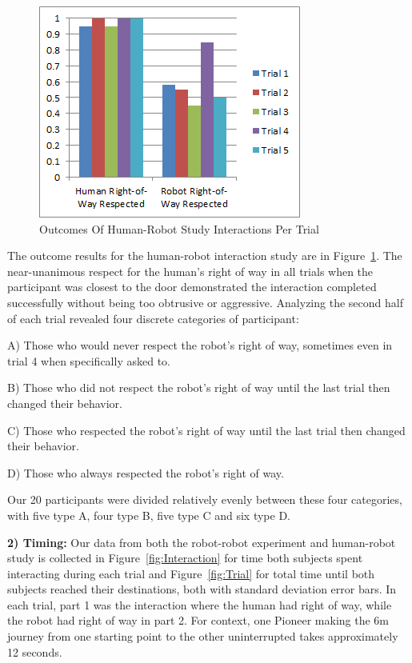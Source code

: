 \documentclass[letterpaper, 10 pt, conference]{ieeeconf}  %
\begin{document}
     \begin{figure}
      \centering
      \includegraphics{outcomes.png}
      \caption{Outcomes Of Human-Robot Study Interactions Per Trial}
      \label{fig:Outcomes}
   \end{figure}

The outcome results for the human-robot interaction study are in Figure~\ref{fig:Outcomes}. The near-unanimous respect for the human's right of way in all trials when the participant was closest to the door demonstrated the interaction completed successfully without being too obtrusive or aggressive. Analyzing the second half of each trial revealed four discrete categories of participant: 

A) Those who would never respect the robot's right of way, sometimes even in trial 4 when specifically asked to. 

B) Those who did not respect the robot's right of way until the last trial then changed their behavior. 

C) Those who respected the robot's right of way until the last trial then changed their behavior. 

D) Those who always respected the robot's right of way. 

Our 20 participants were divided relatively evenly between these four categories, with five type A, four type B, five type C and six type D.
 
\textbf{2) Timing:} Our data from both the robot-robot experiment and human-robot study is collected in Figure~\ref{fig:Interaction} for time both subjects spent interacting during each trial and Figure~\ref{fig:Trial} for total time until both subjects reached their destinations, both with standard deviation error bars. In each trial, part 1 was the interaction where the human had right of way, while the robot had right of way in part 2. For context, one Pioneer making the 6m journey from one starting point to the other uninterrupted takes approximately 12 seconds.   
 
\end{document}

